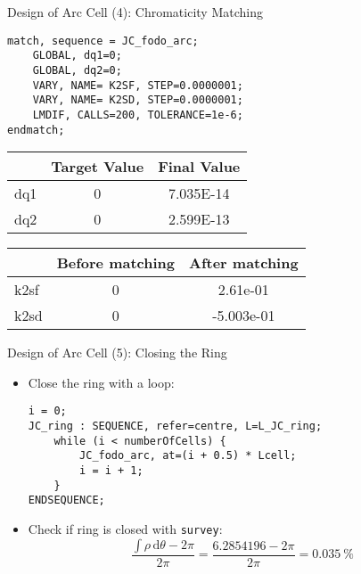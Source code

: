 \documentclass{beamer}
\begin{document}
\begin{frame}[t,fragile]{Design of Arc Cell (4): Chromaticity Matching}
\begin{lstlisting}
match, sequence = JC_fodo_arc;
    GLOBAL, dq1=0;
    GLOBAL, dq2=0;
    VARY, NAME= K2SF, STEP=0.0000001;
    VARY, NAME= K2SD, STEP=0.0000001;
    LMDIF, CALLS=200, TOLERANCE=1e-6;
endmatch;
\end{lstlisting}

\begin{table}
\begin{tabularx}{0.6\textwidth}{lS[table-format=-1.2e-1]S[table-format=-1.2e-1]}
	\toprule
	    & {Target Value} & {Final Value}  \\ \midrule
	dq1 & 0              & 7.035E-14 \\
	dq2 & 0              & 2.599E-13 \\ \bottomrule
\end{tabularx}
\end{table}

\begin{table}
\begin{tabularx}{0.6\textwidth}{lSS[table-format=-1.4e-1]}
	\toprule
	     & {Before matching} & {After matching} \\ \midrule
	k2sf & 0                 & 2.61e-01      \\
	k2sd & 0                 & -5.003e-01     \\ \bottomrule
\end{tabularx}
\end{table}
\end{frame}

\begin{frame}[t,fragile]{Design of Arc Cell (5): Closing the Ring}
\begin{itemize}
\item Close the ring with a loop:
\begin{lstlisting}
i = 0;
JC_ring : SEQUENCE, refer=centre, L=L_JC_ring; 
    while (i < numberOfCells) {
        JC_fodo_arc, at=(i + 0.5) * Lcell;
        i = i + 1;
    }
ENDSEQUENCE;
\end{lstlisting}
\item Check if ring is closed with \texttt{survey}:
\begin{equation*}
\frac{\int\rho\,\text{d}\theta-2\pi}{2\pi}=\frac{\num{6.2854196}-2\pi}{2\pi}=\SI{0.035}{\percent}
\end{equation*}
\end{itemize}
\end{frame}
\end{document}
